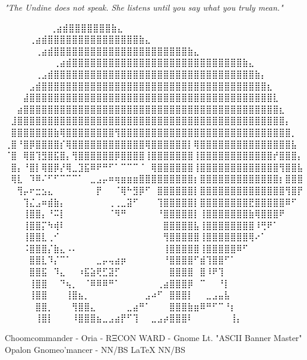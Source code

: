 \vspace{1cm}
\begin{center}
\textit{"The Undine does not speak. She listens until you say what you truly mean."}
\end{center}

\iffalse

  ⠀⠀⠀⠀⠀             ⠀⠀⢀⣴⣾⣿⣿⣿⣿⣿⣿⣿⣷⣄⠀⠀⠀⠀⠀⠀⠀⠀
⠀⠀⠀  ⠀      ⠀⠀⠀⠀⢀⣴⣾⣿⣿⣿⣿⣿⣿⣿⣿⣿⣿⣿⣿⣿⣿⣿⣷⣄⠀⠀⠀⠀⠀⠀⠀⠀
⠀⠀ ⠀   ⠀⠀⠀⠀⠀⢀⣴⣾⣿⣿⣿⣿⣿⣿⣿⣿⣿⣿⣿⣿⣿⣿⣿⣿⣿⣿⣿⣿⣿⣿⣷⣄⠀⠀⠀⠀⠀⠀⠀⠀
⠀⠀⠀⠀⠀⠀⠀⠀⢀⣴⣾⣿⣿⣿⣿⣿⣿⣿⣿⣿⣿⣿⣿⣿⣿⣿⣿⣿⣿⣿⣿⣿⣿⣿⣿⣿⣿⣿⣿⣷⣄⠀⠀⠀⠀⠀⠀⠀⠀
⠀⠀⠀⠀⠀⢀⣠⣾⣿⣿⣿⣿⣿⣿⣿⣿⣿⣿⣿⣿⣿⣿⣿⣿⣿⣿⣿⣿⣿⣿⣿⣿⣿⣿⣿⣿⣿⣿⣿⣿⣿⣷⡄⠀⠀⠀⠀⠀⠀
⠀⠀⠀⠀⣠⣾⣿⣿⣿⣿⣿⣿⣿⣿⣿⣿⣿⣿⣿⣿⣿⣿⣿⣿⣿⣿⣿⣿⣿⣿⣿⣿⣿⣿⣿⣿⣿⣿⣿⣿⣿⣿⣿⣆⠀⠀⠀⠀⠀
⠀⠀⠀⣼⣿⣿⣿⣿⣿⣿⣿⣿⣿⣿⣿⣿⣿⣿⣿⣿⣿⣿⣿⣿⣿⣿⣿⣿⣿⣿⣿⣿⣿⣿⣿⣿⣿⣿⣿⣿⣿⣿⣿⣿⣇⠀⠀⠀⠀
⠀⠀⣴⣿⣿⣿⣿⣿⣿⣿⣿⣿⣿⣿⣿⣿⣿⣿⣿⣿⣿⣿⣿⣿⣿⣿⣿⣿⣿⣿⣿⣿⣿⣿⣿⣿⣿⣿⣿⣿⣿⣿⣿⣿⣿⣆⠀⠀⠀
⠀⣸⣿⣿⣿⣿⣿⣿⣿⣿⣿⣿⣿⣿⣿⣿⣿⣿⣿⣿⣿⣿⣿⣿⣿⣿⣿⣿⣿⣿⣿⣿⣿⣿⣿⣿⣿⣿⣿⣿⣿⣿⣿⣿⣿⣿⡄⠀⠀
⠀⣿⣿⣿⣿⣿⣿⣿⣷⢿⣿⣿⣿⣿⣿⣿⣿⣿⢻⣿⣿⣿⣿⣿⣿⣿⣿⣿⣿⣿⣿⣿⣿⣿⣿⣿⣿⣿⣿⣿⣿⣿⣿⣿⣿⣿⣿⡀⠀
⢀⣿⠘⣿⡿⣿⣿⣿⣿⡎⢿⣿⣿⣿⣿⣿⣿⣿⣿⣿⣿⣿⣿⢿⣿⣿⣿⣿⣿⣿⡇⢿⣿⣿⣿⣿⣿⣿⣿⣿⣿⣿⣿⣿⣿⣿⣿⣧⠀
⠈⣿⠀⢿⣿⢹⣻⣿⣯⣿⡄⢻⣿⣿⣿⣿⣿⣿⡿⣿⣿⣿⣿⢸⣿⣿⣿⣿⣿⣿⣿⢸⣿⣿⣿⣿⣿⣿⣿⣿⣿⣿⣿⣿⡞⣿⣿⣿⡄
⠀⣿⡄⠘⣿⡇⢿⣿⡿⡜⢿⣀⣹⣯⠿⠟⠛⠋⠁⠉⠉⠉⠈⠀⢿⣿⣿⣿⣿⣿⣿⢸⣿⣿⣿⣿⣿⣿⣿⣿⣿⣿⣿⣿⣿⢻⣿⣿⣧
⠀⢿⣇⠀⠹⠿⠌⠋⠋⠉⠉⠉⠁⠀⣀⣠⡤⠶⢶⣶⣶⣶⣿⣿⣿⣿⣿⣿⣿⣿⣿⡆⣿⣿⣿⣿⣿⣿⣿⣿⣿⣿⣿⣿⣿⡆⣿⣿⣿
⠀⠀⢻⡤⠖⣒⣢⣄⠀⠀⠀⠀⠀⠀⠀⡟⠀⠀⠈⢿⠓⣻⡿⠋⠀⣿⣿⣿⣿⣿⣿⡇⣿⣿⣿⣿⣿⣿⣿⣿⣿⣿⣿⣿⣿⣿⢻⣿⡟
⠀⠀⠀⢹⣌⣠⠶⣾⣷⡄⠀⠀⠀⠀⠀⠀⠀⢀⢀⣀⣽⠋⠀⠀⠀⢹⣿⣿⣿⣿⣿⡇⣿⣿⣿⣿⣿⣿⣿⣿⣟⣿⣿⣿⣿⣿⠿⠋⠀
⠀⠀⠀⢸⣿⣿⡄⠘⠭⡇⠀⠀⠀⠀⠀⠀⠀⠈⠻⠛⠀⠀⠀⠀⠀⠘⣿⣿⣿⣿⣿⡇⢸⣿⣿⣿⣿⣿⣿⣿⣷⢿⣿⣿⣿⠟⠀⠀⠀
⠀⠀⠀⢸⣿⣿⡍⠳⢾⠇⠀⠀⠀⠀⠀⠀⠀⠀⠀⠀⠀⠀⠀⠀⠀⠀⣿⣿⣿⣿⣿⣧⢸⣿⣿⣿⣿⣿⣿⣿⣿⠸⢛⠟⠁⠀⠀⠀⠀
⠀⠀⠀⢸⣿⣿⣇⢀⠊⠀⠀⠀⠀⠀⠀⠀⠀⠀⠀⠀⠀⠀⠀⠀⠀⠀⢻⣿⣿⣿⣿⣿⢸⣿⣿⣿⣿⣿⣿⣿⢿⠔⠁⠀⠀⠀⠀⠀⠀
⠀⠀⠀⠨⣿⣿⣿⡌⣷⣄⠠⠄⠀⠀⠀⠀⠀⠀⠀⠀⠀⠀⠀⠀⠀⠀⢸⣿⣿⣿⣿⣿⢸⣿⣿⣿⣿⣿⠿⠋⠀⠀⠀⠀⠀⠀⠀⠀⠀
⠀⠀⠀⠀⣿⣿⣇⠹⡌⠉⠁⠀⠀⠀⠀⣀⡤⢤⣴⡶⠀⠀⠀⠀⠀⠀⠘⣿⣿⣿⣿⠋⣾⢹⣿⣿⠋⠁⠀⠀⠀⠀⠀⠀⠀⠀⠀⠀⠀
⠀⠀⠀⠀⣿⣿⣯⠀⠹⣄⠀⠀⠰⣯⣵⢟⣋⣽⡋⠀⠀⠀⠀⠀⠀⠀⠀⣿⣿⣿⣿⠀⣿⠸⠟⢹⠀⠀⠀⠀⠀⠀⠀⠀⠀⠀⠀⠀⠀
⠀⠀⠀⠀⢸⣿⣿⠀⠀⠙⢦⡀⠀⠈⠿⠿⠿⠛⠁⠀⠀⠀⠀⠀⠀⢀⣴⣿⣿⣿⡿⠀⠉⠀⠀⠘⡇⠀⠀⠀⠀⠀⠀⠀⠀⠀⠀⠀⠀
⠀⠀⠀⠀⢸⣿⣿⠀⠀⠀⢸⣿⣦⡀⠀⠀⠀⠀⠀⠀⠀⠀⠀⣠⠴⠋⠀⣿⣿⣿⡇⠀⠀⣀⣠⣤⣧⠀⠀⠀⠀⠀⠀⠀⠀⠀⠀⠀⠀
⠀⠀⠀⠀⠀⣿⣿⡀⠀⠀⠀⢻⣿⣿⣄⠀⠀⠀⠀⠀⣀⣴⠛⠁⠀⠀⠀⣿⣿⣿⣷⣶⠿⠛⠋⠉⠘⡆⠀⠀⠀⠀⠀⠀⠀⠀⠀⠀⠀
⠀⠀⠀⠀⠀⢸⣿⡇⠀⠀⠀⠸⣿⣿⣿⣦⣀⣠⣴⡟⠋⢹⠀⠀⣀⣠⡴⣿⣿⣿⠇⠀⠀⠀⠀⠀⠀⢸⡄⠀⠀⠀⠀⠀⠀⠀⠀⠀⠀

Choomcommander - Oria - RΞCON WARD - Gnome Lt. "ASCII Banner Master"
             Opalon Gnomeo'mancer - NN/BS LaTeX{} NN/BS

